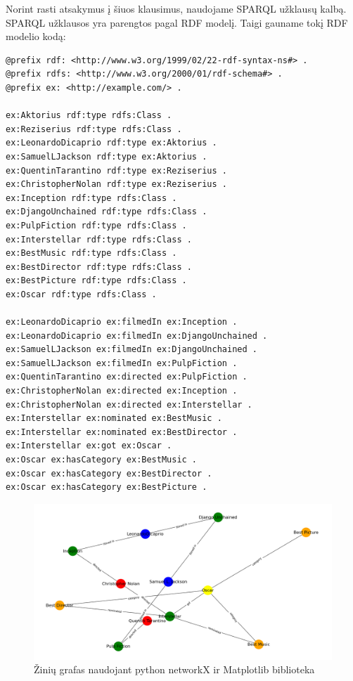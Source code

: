 \documentclass{VUMIFPSkursinis}
\begin{document}
Norint rasti atsakymus į šiuos klausimus, naudojame SPARQL užklausų kalbą. SPARQL užklausos yra parengtos pagal RDF modelį. Taigi gauname tokį RDF modelio kodą:
\begin{lstlisting}[captionpos=b, caption=Pavyzdžio RDF modelis, label=lst:sparql,
   basicstyle=\ttfamily,frame=single]
@prefix rdf: <http://www.w3.org/1999/02/22-rdf-syntax-ns#> .
@prefix rdfs: <http://www.w3.org/2000/01/rdf-schema#> .
@prefix ex: <http://example.com/> .

ex:Aktorius rdf:type rdfs:Class .
ex:Reziserius rdf:type rdfs:Class .
ex:LeonardoDicaprio rdf:type ex:Aktorius .
ex:SamuelLJackson rdf:type ex:Aktorius .
ex:QuentinTarantino rdf:type ex:Reziserius .
ex:ChristopherNolan rdf:type ex:Reziserius .
ex:Inception rdf:type rdfs:Class .
ex:DjangoUnchained rdf:type rdfs:Class .
ex:PulpFiction rdf:type rdfs:Class .
ex:Interstellar rdf:type rdfs:Class .
ex:BestMusic rdf:type rdfs:Class .
ex:BestDirector rdf:type rdfs:Class .
ex:BestPicture rdf:type rdfs:Class .
ex:Oscar rdf:type rdfs:Class .

ex:LeonardoDicaprio ex:filmedIn ex:Inception .
ex:LeonardoDicaprio ex:filmedIn ex:DjangoUnchained .
ex:SamuelLJackson ex:filmedIn ex:DjangoUnchained .
ex:SamuelLJackson ex:filmedIn ex:PulpFiction .
ex:QuentinTarantino ex:directed ex:PulpFiction .
ex:ChristopherNolan ex:directed ex:Inception .
ex:ChristopherNolan ex:directed ex:Interstellar .
ex:Interstellar ex:nominated ex:BestMusic .
ex:Interstellar ex:nominated ex:BestDirector .
ex:Interstellar ex:got ex:Oscar .
ex:Oscar ex:hasCategory ex:BestMusic .
ex:Oscar ex:hasCategory ex:BestDirector .
ex:Oscar ex:hasCategory ex:BestPicture .
\end{lstlisting}
\pagebreak

\begin{figure}[htbp]
  \centering
  \includegraphics[width=1\textwidth]{img/last_graph_rdf.png}
  \caption{Žinių grafas naudojant python networkX ir Matplotlib biblioteka}
  \label{fig:sample_image}
\end{figure}
\end{document}
